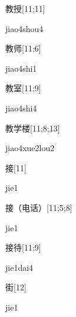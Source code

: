 \begin{verbete}{教授}[11;11]
\begin{pronuncia}{jiao4shou4}
\end{pronuncia}
\end{verbete}

\begin{verbete}{教师}[11;6]
\begin{pronuncia}{jiao4shi1}
\end{pronuncia}
\end{verbete}

\begin{verbete}{教室}[11;9]
\begin{pronuncia}{jiao4shi4}
\end{pronuncia}
\end{verbete}

\begin{verbete}{教学楼}[11;8;13]
\begin{pronuncia}{jiao4xue2lou2}
\end{pronuncia}
\end{verbete}

\begin{verbete}[jie1]{接}[11]
\begin{pronuncia}{jie1}
\end{pronuncia}
\end{verbete}

\begin{verbete}[jie1]{接（电话）}[11;5;8]
\begin{pronuncia}{jie1}
\end{pronuncia}
\end{verbete}

\begin{verbete}{接待}[11;9]
\begin{pronuncia}{jie1dai4}
\end{pronuncia}
\end{verbete}

\begin{verbete}[jie1]{街}[12]
\begin{pronuncia}{jie1}
\end{pronuncia}
\end{verbete}


